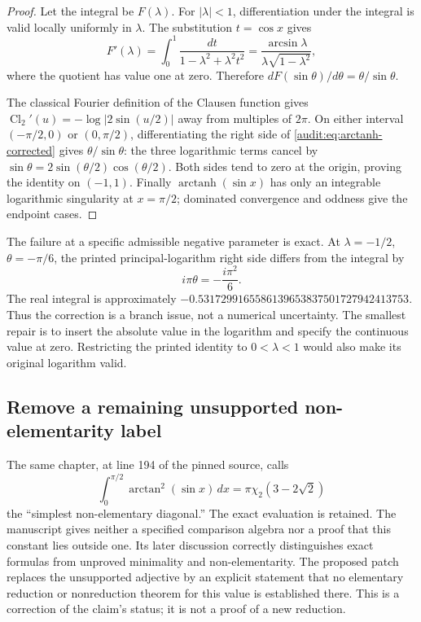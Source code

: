 \begin{proof}
Let the integral be $F(\lambda)$.  For $|\lambda|<1$, differentiation
under the integral is valid locally uniformly in $\lambda$.  The
substitution $t=\cos x$ gives
\[
 F'(\lambda)=\int_0^1
       \frac{dt}{1-\lambda^2+\lambda^2t^2}
 =\frac{\arcsin\lambda}{\lambda\sqrt{1-\lambda^2}},
\]
where the quotient has value one at zero.  Therefore
$dF(\sin\theta)/d\theta=\theta/\sin\theta$.

The classical Fourier definition of the Clausen function gives
$\operatorname{Cl}_2'(u)=-\log|2\sin(u/2)|$ away from multiples
of $2\pi$.  On either interval $(-\pi/2,0)$ or $(0,\pi/2)$,
differentiating the right side of \eqref{audit:eq:arctanh-corrected}
gives $\theta/\sin\theta$: the three logarithmic terms cancel by
$\sin\theta=2\sin(\theta/2)\cos(\theta/2)$.
Both sides tend to zero at the origin, proving the identity on
$(-1,1)$.  Finally $\operatorname{arctanh}(\sin x)$ has only an
integrable logarithmic singularity at $x=\pi/2$; dominated convergence
and oddness give the endpoint cases.
\end{proof}

The failure at a specific admissible negative parameter is exact.  At
$\lambda=-1/2$, $\theta=-\pi/6$, the printed principal-logarithm
right side differs from the integral by
\[
 i\pi\theta=-\frac{i\pi^2}{6}.
\]
The real integral is approximately
$-0.5317299165586139653837501727942413753$.
Thus the correction is a branch issue, not a numerical uncertainty.
The smallest repair is to insert the absolute value in the logarithm
and specify the continuous value at zero.  Restricting the printed
identity to $0<\lambda<1$ would also make its original logarithm valid.

\subsection{Remove a remaining unsupported non-elementarity label}

The same chapter, at line 194 of the pinned source, calls
\[
 \int_0^{\pi/2}\arctan^2(\sin x)\,dx
       =\pi\chi_2(3-2\sqrt2)
\]
the ``simplest non-elementary diagonal.''  The exact evaluation is
retained.  The manuscript gives neither a specified comparison algebra
nor a proof that this constant lies outside one.  Its later discussion
correctly distinguishes exact formulas from unproved minimality and
non-elementarity.  The proposed patch replaces the unsupported adjective
by an explicit statement that no elementary reduction or nonreduction
theorem for this value is established there.  This is a correction of
the claim's status; it is not a proof of a new reduction.

